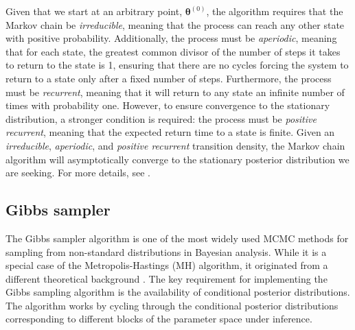 Given that we start at an arbitrary point, $\bm{\theta}^{(0)}$, the algorithm requires that the Markov chain be \textit{irreducible}, meaning that the process can reach any other state with positive probability. Additionally, the process must be \textit{aperiodic}, meaning that for each state, the greatest common divisor of the number of steps it takes to return to the state is 1, ensuring that there are no cycles forcing the system to return to a state only after a fixed number of steps. Furthermore, the process must be \textit{recurrent}, meaning that it will return to any state an infinite number of times with probability one. However, to ensure convergence to the stationary distribution, a stronger condition is required: the process must be \textit{positive recurrent}, meaning that the expected return time to a state is finite. Given an \textit{irreducible}, \textit{aperiodic}, and \textit{positive recurrent} transition density, the Markov chain algorithm will asymptotically converge to the stationary posterior distribution we are seeking. For more details, see \cite[chap.~6]{robert2011monte}.
   

\subsection{Gibbs sampler}\label{sec511}

The Gibbs sampler algorithm is one of the most widely used MCMC methods for sampling from non-standard distributions in Bayesian analysis. While it is a special case of the Metropolis-Hastings (MH) algorithm, it originated from a different theoretical background \cite{Geman1984,Gelfand1990}. The key requirement for implementing the Gibbs sampling algorithm is the availability of conditional posterior distributions. The algorithm works by cycling through the conditional posterior distributions corresponding to different blocks of the parameter space under inference.

